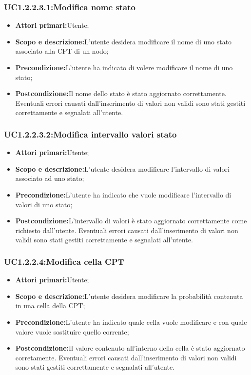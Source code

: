 \subsubsection{UC1.2.2.3.1:Modifica nome stato}
\begin{itemize}
	\item{\textbf{Attori primari:}Utente;}
	\item{\textbf{Scopo e descrizione:}L'utente desidera modificare il nome di uno stato associato alla CPT di un nodo;}
	\item{\textbf{Precondizione:}L'utente ha indicato di volere modificare il nome di uno stato;}
	\item{\textbf{Postcondizione:}Il nome dello stato è stato aggiornato correttamente. Eventuali errori causati dall'inserimento di valori non validi sono stati gestiti correttamente e segnalati all'utente.}
\end{itemize}
\subsubsection{UC1.2.2.3.2:Modifica intervallo valori stato}
\begin{itemize}
	\item{\textbf{Attori primari:}Utente;}
	\item{\textbf{Scopo e descrizione:}L'utente desidera modificare l'intervallo di valori associato ad uno stato;}
	\item{\textbf{Precondizione:}L'utente ha indicato che vuole modificare l'intervallo di valori di uno stato;}
	\item{\textbf{Postcondizione:}L'intervallo di valori è stato aggiornato correttamente come richiesto dall'utente. Eventuali errori causati dall'inserimento di valori non validi sono stati gestiti correttamente e segnalati all'utente.}
\end{itemize}
\subsubsection{UC1.2.2.4:Modifica cella CPT}
\begin{itemize}
	\item{\textbf{Attori primari:}Utente;}
	\item{\textbf{Scopo e descrizione:}L'utente desidera modificare la probabilità contenuta in una cella della CPT;}
	\item{\textbf{Precondizione:}L'utente ha indicato quale cella vuole modificare e con quale valore vuole sostituire quello corrente;}
	\item{\textbf{Postcondizione:}Il valore contenuto all'interno della cella è stato aggiornato corretamente. Eventuali errori causati dall'inserimento di valori non validi sono stati gestiti correttamente e segnalati all'utente.}
\end{itemize}
